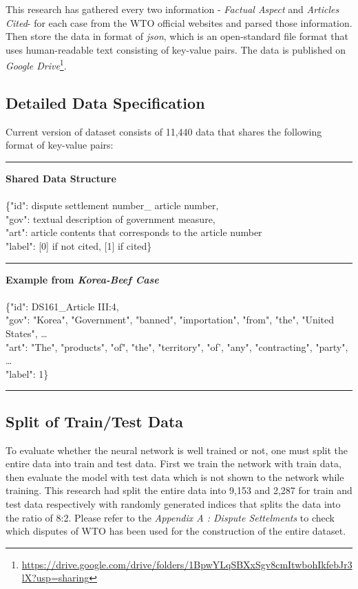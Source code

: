 \documentclass[sigconf]{acmart}
\begin{document}
This research has gathered every two information - \textit{Factual Aspect} and \textit{Articles Cited}- for each case from the WTO official websites and parsed those information. Then store the data in format of \textit{json}, which is an open-standard file format that uses human-readable text consisting of key-value pairs. The data is published on \textit{Google Drive}\footnote{\url{https://drive.google.com/drive/folders/1BpwYLqSBXxSgv8cmItwbohIkfebJr3lX?usp=sharing}}. 

\subsection{Detailed Data Specification}
Current version of dataset consists of 11,440 data that shares the following format of key-value pairs:\\
\begin{displayquote}
\noindent\rule{7cm}{0.4pt}
\textbf{Shared Data Structure}\\\\
 \{"id": dispute settlement number\_ article number, \\
   "gov": textual description of government measure, \\
   "art": article contents that corresponds to the article number\\ 
   "label": [0] if not cited, [1] if cited\}\\   
\noindent\rule{7cm}{0.4pt}
\textbf{Example from \textit{Korea-Beef Case}}\\\\
    \{"id": DS161\_Article III:4, \\
   "gov": "Korea", "Government", "banned", "importation", "from", "the", "United States", \ldots\\
   "art": "The", "products", "of", "the", "territory", "of', "any", "contracting", "party", \ldots\\ 
   "label": 1\}\\
\noindent\rule{7cm}{0.4pt}
\end{displayquote} 

\subsection{Split of Train/Test Data}
To evaluate whether the neural network is well trained or not, one must split the entire data into train and test data. First we train the network with train data, then evaluate the model with test data which is not shown to the network while training. This research had split the entire data into 9,153 and 2,287 for train and test data respectively with randomly generated indices that splits the data into the ratio of 8:2. Please refer to the \textit{Appendix A : Dispute Settelments} to check which disputes of WTO has been used for the construction of the entire dataset.
\end{document}
